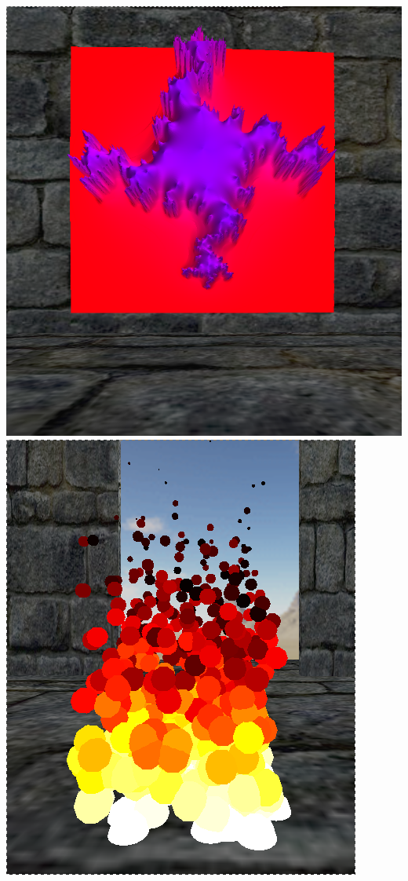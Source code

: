 \documentclass[10pt]{article}
\begin{document}
    \includegraphics[scale=0.2]{rr1.png}
    \includegraphics[scale=0.3]{rr2.png}
\end{document}
